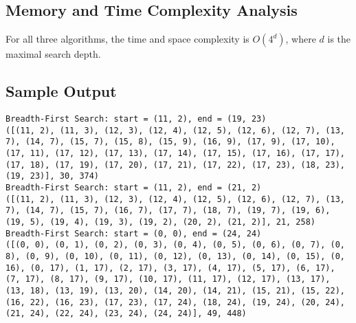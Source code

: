 \documentclass[12pt]{article}
\begin{document}
\subsection*{Memory and Time Complexity Analysis}
For all three algorithms, the time and space complexity is $O(4^d)$, where $d$ is the maximal search depth.

\subsection*{Sample Output}
\begin{lstlisting}[breaklines=true]
Breadth-First Search: start = (11, 2), end = (19, 23)
([(11, 2), (11, 3), (12, 3), (12, 4), (12, 5), (12, 6), (12, 7), (13, 7), (14, 7), (15, 7), (15, 8), (15, 9), (16, 9), (17, 9), (17, 10), (17, 11), (17, 12), (17, 13), (17, 14), (17, 15), (17, 16), (17, 17), (17, 18), (17, 19), (17, 20), (17, 21), (17, 22), (17, 23), (18, 23), (19, 23)], 30, 374)
Breadth-First Search: start = (11, 2), end = (21, 2)
([(11, 2), (11, 3), (12, 3), (12, 4), (12, 5), (12, 6), (12, 7), (13, 7), (14, 7), (15, 7), (16, 7), (17, 7), (18, 7), (19, 7), (19, 6), (19, 5), (19, 4), (19, 3), (19, 2), (20, 2), (21, 2)], 21, 258)
Breadth-First Search: start = (0, 0), end = (24, 24)
([(0, 0), (0, 1), (0, 2), (0, 3), (0, 4), (0, 5), (0, 6), (0, 7), (0, 8), (0, 9), (0, 10), (0, 11), (0, 12), (0, 13), (0, 14), (0, 15), (0, 16), (0, 17), (1, 17), (2, 17), (3, 17), (4, 17), (5, 17), (6, 17), (7, 17), (8, 17), (9, 17), (10, 17), (11, 17), (12, 17), (13, 17), (13, 18), (13, 19), (13, 20), (14, 20), (14, 21), (15, 21), (15, 22), (16, 22), (16, 23), (17, 23), (17, 24), (18, 24), (19, 24), (20, 24), (21, 24), (22, 24), (23, 24), (24, 24)], 49, 448)


\end{lstlisting}
\end{document}
